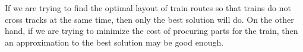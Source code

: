 If we are trying to find the optimal layout of train routes so that trains do
not cross tracks at the same time, then only the best solution will do. On the
other hand, if we are trying to minimize the cost of procuring parts for the
train, then an approximation to the best solution may be good enough.
